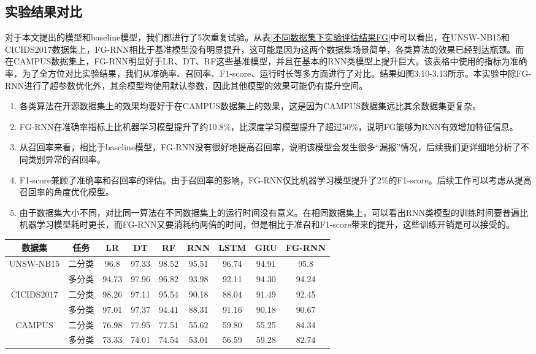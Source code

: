 \subsection{实验结果对比}
对于本文提出的模型和baseline模型，我们都进行了5次重复试验。从表\ref{不同数据集下实验评估结果FG}中可以看出，在UNSW-NB15和CICIDS2017数据集上，FG-RNN相比于基准模型没有明显提升，这可能是因为这两个数据集场景简单，各类算法的效果已经到达瓶颈。而在CAMPUS数据集上，FG-RNN明显好于LR、DT、RF这些基准模型，并且在基本的RNN类模型上提升巨大。该表格中使用的指标为准确率，为了全方位对比实验结果，我们从准确率、召回率、F1-score、运行时长等多方面进行了对比。结果如图3.10-3.13所示。本实验中除FG-RNN进行了超参数优化外，其余模型均使用默认参数，因此其他模型的效果可能仍有提升空间。
\begin{enumerate}
  \item 各类算法在开源数据集上的效果均要好于在CAMPUS数据集上的效果，这是因为CAMPUS数据集远比其余数据集更复杂。
  \item FG-RNN在准确率指标上比机器学习模型提升了约10.8\%，比深度学习模型提升了超过50\%，说明FG能够为RNN有效增加特征信息。
  \item 从召回率来看，相比于baseline模型，FG-RNN没有很好地提高召回率，说明该模型会发生很多“漏报”情况，后续我们更详细地分析了不同类别异常的召回率。
  \item F1-score兼顾了准确率和召回率的评估。由于召回率的影响，FG-RNN仅比机器学习模型提升了2\%的F1-score。后续工作可以考虑从提高召回率的角度优化模型。
  \item 由于数据集大小不同，对比同一算法在不同数据集上的运行时间没有意义。在相同数据集上，可以看出RNN类模型的训练时间要普遍比机器学习模型耗时更长，而FG-RNN又要消耗约两倍的时间，但是相比于准召和F1-score带来的提升，这些训练开销是可以接受的。
\end{enumerate}
\begin{table*}[h]
  \small
  \caption{不同数据集下实验评估结果(\%)}
  \label{不同数据集下实验评估结果FG}
  \centering
  \begin{tabular}{c|c|ccc|ccc|c}
  \toprule
  
    数据集 &  任务  &  
    LR &  DT & RF & RNN & LSTM & GRU & FG-RNN  \\
  \midrule
  
  UNSW-NB15 & 二分类 & 96.8 & 97.33 & 98.52 &  95.51 & 96.74 & 94.91 & 95.8 \\ 
  
  & 多分类 &94.73 & 97.96 & 96.82 & 93.98 & 92.11 & 94.30 & 94.24 \\
  
  \midrule
  CICIDS2017 & 二分类 & 98.26 & 97.11 & 95.54 & 90.18 & 88.04 & 91.49 & 92.45 \\
  & 多分类 & 97.01 & 97.37 & 94.41 & 88.31 & 91.16 & 90.18 & 90.67\\
  \midrule
  CAMPUS & 二分类 & 76.98 & 77.95 & 77.51 & 55.62 & 59.80 & 55.25 & 84.34 \\
  & 多分类 & 73.33 & 74.01 & 74.54 & 53.01 & 56.59 & 59.28 & 82.74\\
  
    \bottomrule
  
  \end{tabular}
  \end{table*}

